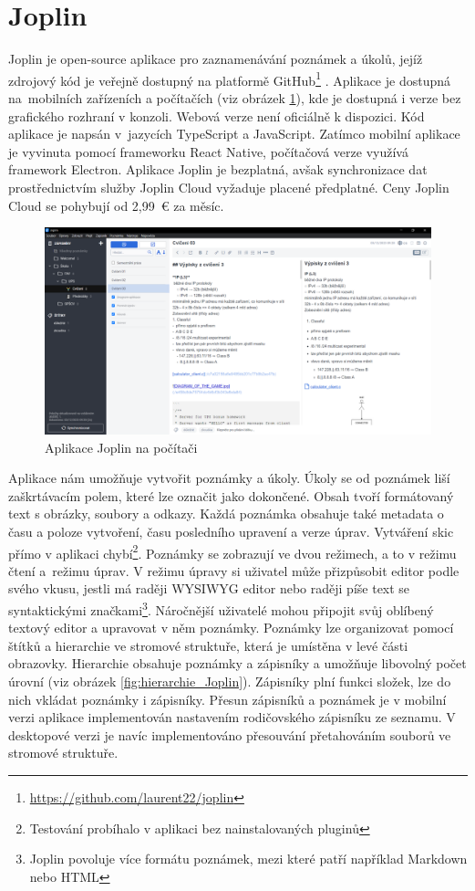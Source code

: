 \documentclass[czech, bc, kiv, he, iso690numb]{fasthesis}
\begin{document}
\section{Joplin}

Joplin je open-source aplikace pro zaznamenávání poznámek a úkolů, jejíž zdrojový kód je veřejně dostupný na platformě GitHub\footnote{\url{https://github.com/laurent22/joplin}} \cite{Joplin-website}. Aplikace je dostupná na~mobilních zařízeních a počítačích (viz obrázek \ref{fig:joplinOnPc}), kde je dostupná i verze bez grafického rozhraní v konzoli. Webová verze není oficiálně k dispozici. Kód aplikace je napsán v~jazycích TypeScript a JavaScript. Zatímco mobilní aplikace je vyvinuta pomocí frameworku React Native, počítačová verze využívá framework Electron. Aplikace Joplin je bezplatná, avšak synchronizace dat prostřednictvím služby Joplin Cloud vyžaduje placené předplatné. Ceny Joplin Cloud se pohybují od 2,99~€ za měsíc.

\begin{figure}[h!]
  \centering
  \includegraphics[width=1\textwidth]{img/BP-Runt/Joplin/Joplin_pc.PNG}
  \caption{Aplikace Joplin na počítači}
  \label{fig:joplinOnPc}
\end{figure}

Aplikace nám umožňuje vytvořit poznámky a úkoly. Úkoly se od poznámek liší zaškrtávacím polem, které lze označit jako dokončené. Obsah tvoří formátovaný text s obrázky, soubory a odkazy. Každá poznámka obsahuje také metadata o času a poloze vytvoření, času posledního upravení a verze úprav. Vytváření skic přímo v aplikaci chybí\footnote{Testování probíhalo v aplikaci bez nainstalovaných pluginů}. Poznámky se zobrazují ve dvou režimech, a to v režimu čtení a~režimu úprav. V režimu úpravy si uživatel může přizpůsobit editor podle svého vkusu, jestli má raději \gls{WYSIWYG} editor nebo raději píše text se syntaktickými značkami\footnote{Joplin povoluje více formátu poznámek, mezi které patří například Markdown nebo \gls{HTML}}. Náročnější uživatelé mohou připojit svůj oblíbený textový editor a upravovat v něm poznámky. Poznámky lze organizovat pomocí štítků a hierarchie ve stromové struktuře, která je umístěna v levé části obrazovky. Hierarchie obsahuje poznámky a zápisníky a umožňuje libovolný počet úrovní (viz obrázek \ref{fig:hierarchie_Joplin}). Zápisníky plní funkci složek, lze do nich vkládat poznámky i zápisníky. Přesun zápisníků a poznámek je v mobilní verzi aplikace implementován nastavením rodičovského zápisníku ze seznamu. V desktopové verzi je navíc implementováno přesouvání přetahováním souborů ve stromové struktuře.
\end{document}
